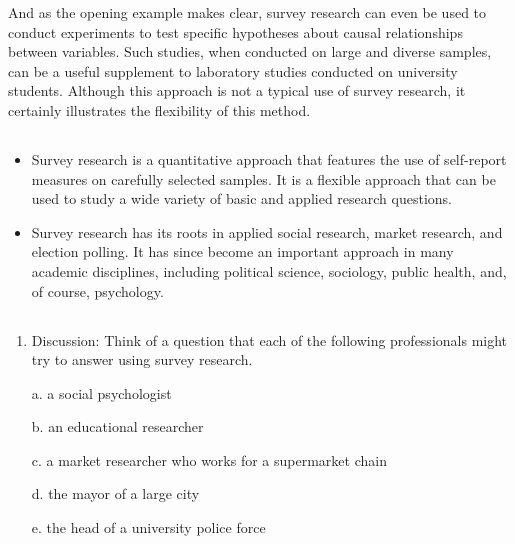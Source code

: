 And as the opening example makes clear, survey research can even be used to conduct experiments to test specific hypotheses about causal relationships between variables. Such studies, when conducted on large and diverse samples, can be a useful supplement to laboratory studies conducted on university students. Although this approach is not a typical use of survey research, it certainly illustrates the flexibility of this method.


\subsection{}

\begin{fullwidth}

\begin{itemize}


\item Survey research is a quantitative approach that features the use of self-report measures on carefully selected samples. It is a flexible approach that can be used to study a wide variety of basic and applied research questions.

\item Survey research has its roots in applied social research, market research, and election polling. It has since become an important approach in many academic disciplines, including political science, sociology, public health, and, of course, psychology.


\end{itemize}

\end{fullwidth}



\subsection{}

\begin{fullwidth}

\begin{enumerate}

\item  Discussion: Think of a question that each of the following professionals might try to answer using survey research.

a. a social psychologist

b. an educational researcher

c. a market researcher who works for a supermarket chain 

d. the mayor of a large city

e. the head of a university police force

\end{enumerate}

\end{fullwidth}  

